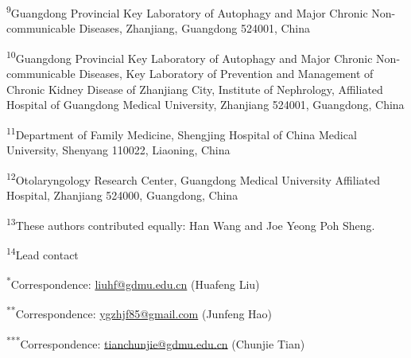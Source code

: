 \begin{singlespace}
{\noindent\textsuperscript{9}Guangdong Provincial Key Laboratory of Autophagy and Major Chronic Non-communicable Diseases, Zhanjiang, Guangdong 524001, China\par\smallskip
\noindent\textsuperscript{10}Guangdong Provincial Key Laboratory of Autophagy and Major Chronic Non-communicable Diseases, Key Laboratory of Prevention and Management of Chronic Kidney Disease of Zhanjiang City, Institute of Nephrology, Affiliated Hospital of Guangdong Medical University, Zhanjiang 524001, Guangdong, China\par\smallskip
\noindent\textsuperscript{11}Department of Family Medicine, Shengjing Hospital of China Medical University, Shenyang 110022, Liaoning, China\par\smallskip
\noindent\textsuperscript{12}Otolaryngology Research Center, Guangdong Medical University Affiliated Hospital, Zhanjiang 524000, Guangdong, China\par\smallskip
\noindent\textsuperscript{13}These authors contributed equally: Han Wang and Joe Yeong Poh Sheng.\par
\noindent\textsuperscript{14}Lead contact\par
\smallskip
\noindent\textsuperscript{*}Correspondence: \href{mailto:liuhf@gdmu.edu.cn}{liuhf@gdmu.edu.cn} (Huafeng Liu)\par
\noindent\textsuperscript{**}Correspondence: \href{mailto:ygzhjf85@gmail.com}{ygzhjf85@gmail.com} (Junfeng Hao)\par
\noindent\textsuperscript{***}Correspondence: \href{mailto:tianchunjie@gdmu.edu.cn}{tianchunjie@gdmu.edu.cn} (Chunjie Tian)\par
}
\end{singlespace}
\clearpage
